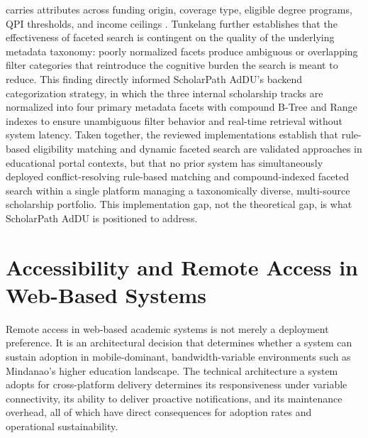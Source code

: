 carries attributes across funding origin, coverage type, eligible degree programs, QPI thresholds, and income ceilings \cite{ref4}. Tunkelang \cite{ref43} further establishes that the effectiveness of faceted search is contingent on the quality of the underlying metadata taxonomy: poorly normalized facets produce ambiguous or overlapping filter categories that reintroduce the cognitive burden the search is meant to reduce. This finding directly informed ScholarPath AdDU's backend categorization strategy, in which the three internal scholarship tracks are normalized into four primary metadata facets with compound B-Tree and Range indexes to ensure unambiguous filter behavior and real-time retrieval without system latency. Taken together, the reviewed implementations establish that rule-based eligibility matching and dynamic faceted search are validated approaches in educational portal contexts, but that no prior system has simultaneously deployed conflict-resolving rule-based matching and compound-indexed faceted search within a single platform managing a taxonomically diverse, multi-source scholarship portfolio. This implementation gap, not the theoretical gap, is what ScholarPath AdDU is positioned to address.

\section{Accessibility and Remote Access in Web-Based Systems}

Remote access in web-based academic systems is not merely a deployment preference. It is an architectural decision that determines whether a system can sustain adoption in mobile-dominant, bandwidth-variable environments such as Mindanao's higher education landscape. The technical architecture a system adopts for cross-platform delivery determines its responsiveness under variable connectivity, its ability to deliver proactive notifications, and its maintenance overhead, all of which have direct consequences for adoption rates and operational sustainability.

